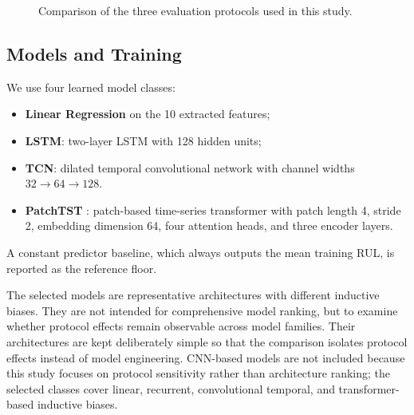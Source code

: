 \documentclass[pdflatex,sn-mathphys-num]{sn-jnl}
\begin{document}
\begin{figure}[t]
\centering
{}
\caption{Comparison of the three evaluation protocols used in this study.}
\label{fig:protocols}
\end{figure}

\subsection{Models and Training}
We use four learned model classes:
\begin{itemize}
    \item \textbf{Linear Regression} on the 10 extracted features;
    \item \textbf{LSTM}: two-layer LSTM with 128 hidden units;
    \item \textbf{TCN}: dilated temporal convolutional network with channel widths $32 \to 64 \to 128$.
    \item \textbf{PatchTST} \cite{patchtst2023}: patch-based time-series transformer with patch length 4, stride 2, embedding dimension 64, four attention heads, and three encoder layers. \cite{vaswani2017attention}
\end{itemize}
A constant predictor baseline, which always outputs the mean training RUL, is reported as the reference floor.

The selected models are representative architectures with different inductive biases. They are not intended for comprehensive model ranking, but to examine whether protocol effects remain observable across model families. Their architectures are kept deliberately simple so that the comparison isolates protocol effects instead of model engineering. CNN-based models are not included because this study focuses on protocol sensitivity rather than architecture ranking; the selected classes cover linear, recurrent, convolutional temporal, and transformer-based inductive biases.
\end{document}
